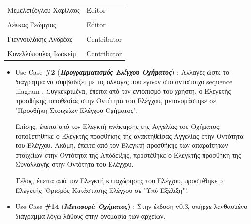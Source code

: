 \documentclass{../ol-softwaremanual}
\begin{document}
	
	\vspace{20pt}
	
	\begin{table}[htbp!]
		\begin{tabular}{ll}
			Μεμελετζόγλου Χαρίλαος & \en Editor \\
			\\ Λέκκας Γεώργιος      &   \en  Editor \\
			\\ Γιαννουλάκης Ανδρέας & \en Contributor \\
			\\ Κανελλόπουλος Ιωακείμ & \en Contributor \\ 
		\end{tabular}
	\end{table}
	
	
	\flushleft
	
	\begin{itemize}		
		\item \en Use Case  \textbf{\#2} (\gr \textbf{\textit{Προγραμματισμός Ελέγχου Οχήματος}) }: Αλλαγές ώστε το διάγραμμα να συμβαδίζει με τις αλλαγές που έγιναν στο αντίστοιχο \en sequence diagram \gr. Συγκεκριμένα, έπειτα από τον εντοπισμό του χρήστη, ο Ελεγκτής προσθήκης τοποθεσίας στην Οντότητα του Ελέγχου, μετονομάστηκε σε \en"\gr Προσθήκη Στοιχείων Ελέγχου Οχήματος\en"\gr. 
		
		Επίσης, έπειτα από τον Ελεγκτή ανάκτησης της Αγγελίας του Οχήματος, τοποθετήθηκε ο Ελεγκτής προσθήκης της ανακτηθείσας Αγγελίας στην Οντότητα του Ελέγχου. Ακόμη, έπειτα από τον Ελεγκτή προσθήκης των απαραίτητων στοιχείων στην Οντότητα της Απόδειξης, προστέθηκε ο Ελεγκτής προσθήκη της Συναλλαγής στην Οντότητα του Ελέγχου.
		
		Τέλος, έπειτα από τον Ελεγκτή καταχώρησης του Ελέγχου, προστέθηκε ο Ελεγκτής \en'\gr Ορισμός Κατάστασης Ελέγχου σε \en"\gr Υπό Εξέλιξη\en"'\gr.
		
		\item \en Use Case  \textbf{\#14} (\gr \textbf{\textit{Μεταφορά Οχήματος}) }:  Στην έκδοση \en v0.3\gr, υπήρχε λανθασμένο διάγραμμα λόγω λάθους στην ονομασία των αρχείων.
		
		
	\end{itemize}	
	
	
	\newpage
	
\end{document}
